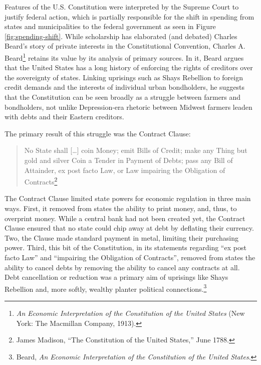 \documentclass[12pt,oneside]{psthesis}
\begin{document}
Features of the U.S. Constitution were interpreted by the Supreme Court to justify federal action, which is partially responsible for the shift in spending from states and municipalities to the federal government as seen in Figure \ref{fig:spending-shift}.
While scholarship has elaborated (and debated) Charles Beard's story of private interests in the Constitutional Convention, Charles A. Beard\footnote{\emph{An Economic Interpretation of the Constitution of the United States} (New York: The Macmillan Company, 1913).} retains its value by its analysis of primary sources.
In it, Beard argues that the United States has a long history of enforcing the rights of creditors over the sovereignty of states.
Linking uprisings such as Shays Rebellion to foreign credit demands and the interests of individual urban bondholders, he suggests that the Constitution can be seen broadly as a struggle between farmers and bondholders, not unlike Depression-era rhetoric between Midwest farmers leaden with debts and their Eastern creditors.

The primary result of this struggle was the Contract Clause:
\begin{quote}
No State shall {[}\ldots{]} coin Money; emit Bills of Credit; make any Thing but gold and silver Coin a Tender in Payment of Debts; pass any Bill of Attainder, ex post facto Law, or Law impairing the Obligation of Contracts\footnote{James Madison, ``The Constitution of the United States,'' June 1788.}
\end{quote}
The Contract Clause limited state powers for economic regulation in three main ways.
First, it removed from states the ability to print money, and, thus, to overprint money.
While a central bank had not been created yet, the Contract Clause ensured that no state could chip away at debt by deflating their currency.
Two, the Clause made standard payment in metal, limiting their purchasing power.
Third, this bit of the Constitution, in its statements regarding ``ex post facto Law'' and ``impairing the Obligation of Contracts'', removed from states the ability to cancel debts by removing the ability to cancel any contracts at all.
Debt cancellation or reduction was a primary aim of uprisings like Shays Rebellion and, more softly, wealthy planter political connections.\footnote{Beard, \emph{An Economic Interpretation of the Constitution of the United States}.}
\end{document}
